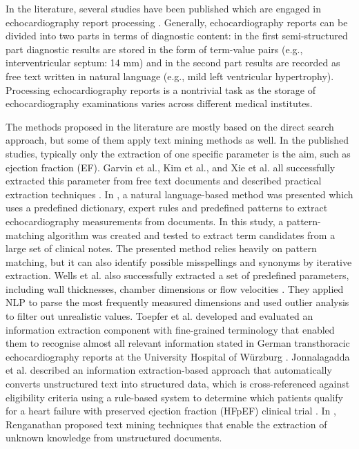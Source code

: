 

In the literature, several studies have been published which are engaged in echocardiography report processing \cite{xie2017extracting, garvin2012automated, kim2017extraction, patterson2017unlocking, wells2014extraction, toepfer2015fine, jonnalagadda2017text, renganathan2017text}. Generally, echocardiography reports can be divided into two parts in terms of diagnostic content: in the first semi-structured part diagnostic results are stored in the form of term-value pairs (e.g., interventricular septum: 14 mm) and in the second part results are recorded as free text written in natural language (e.g., mild left ventricular hypertrophy). Processing echocardiography reports is a nontrivial task as the storage of echocardiography examinations varies across different medical institutes.

The methods proposed in the literature are mostly based on the direct search approach, but some of them apply text mining methods as well. In the published studies, typically only the extraction of one specific parameter is the aim, such as ejection fraction (EF). Garvin et al., Kim et al., and Xie et al. all successfully extracted this parameter from free text documents and described practical extraction techniques \cite{xie2017extracting, garvin2012automated, kim2017extraction}. In \cite{patterson2017unlocking}, a natural language-based method was presented which uses a predefined dictionary, expert rules and predefined patterns to extract echocardiography measurements from documents. In this study, a pattern-matching algorithm was created and tested to extract term candidates from a large set of clinical notes. The presented method relies heavily on pattern matching, but it can also identify possible misspellings and synonyms by iterative extraction. Wells et al. also successfully extracted a set of predefined parameters, including wall thicknesses, chamber dimensions or flow velocities \cite{wells2014extraction}. They applied NLP to parse the most frequently measured dimensions and used outlier analysis to filter out unrealistic values. Toepfer et al. developed and evaluated an information extraction component with fine-grained terminology that enabled them to recognise almost all relevant information stated in German transthoracic echocardiography reports at the University Hospital of Würzburg \cite{toepfer2015fine}. Jonnalagadda et al. described an information extraction-based approach that automatically converts unstructured text into structured data, which is cross-referenced against eligibility criteria using a rule-based system to determine which patients qualify for a heart failure with preserved ejection fraction (HFpEF) clinical trial \cite{jonnalagadda2017text}. In \cite{renganathan2017text}, Renganathan proposed text mining techniques that enable the extraction of unknown knowledge from unstructured documents.

